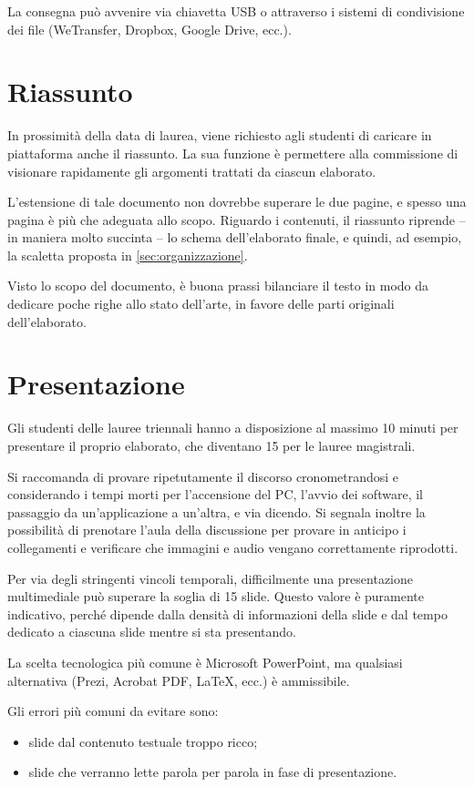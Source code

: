 \documentclass[12pt]{report}
\begin{document}
    La consegna può avvenire via chiavetta USB o attraverso i sistemi di condivisione dei file (WeTransfer, Dropbox, Google Drive, ecc.).


    \section{Riassunto}
    In prossimità della data di laurea, viene richiesto agli studenti di caricare in piattaforma anche il riassunto. La sua funzione è permettere alla commissione di visionare rapidamente gli argomenti trattati da ciascun elaborato.

    L'estensione di tale documento non dovrebbe superare le due pagine, e spesso una pagina è più che adeguata allo scopo. Riguardo i contenuti, il riassunto riprende -- in maniera molto succinta -- lo schema dell'elaborato finale, e quindi, ad esempio, la scaletta proposta in \ref{sec:organizzazione}.

    Visto lo scopo del documento, è buona prassi bilanciare il testo in modo da dedicare poche righe allo stato dell'arte, in favore delle parti originali dell'elaborato.


    \section{Presentazione}
    Gli studenti delle lauree triennali hanno a disposizione al massimo 10 minuti per presentare il proprio elaborato, che diventano 15 per le lauree magistrali.

    Si raccomanda di provare ripetutamente il discorso cronometrandosi e considerando i tempi morti per l'accensione del PC, l'avvio dei software, il passaggio da un'applicazione a un'altra, e via dicendo. Si segnala inoltre la possibilità di prenotare l'aula della discussione per provare in anticipo i collegamenti e verificare che immagini e audio vengano correttamente riprodotti.

    Per via degli stringenti vincoli temporali, difficilmente una presentazione multimediale può superare la soglia di 15 slide. Questo valore è puramente indicativo, perché dipende dalla densità di informazioni della slide e dal tempo dedicato a ciascuna slide mentre si sta presentando.

    La scelta tecnologica più comune è Microsoft PowerPoint, ma qualsiasi alternativa (Prezi, Acrobat PDF, \LaTeX, ecc.) è ammissibile.

    Gli errori più comuni da evitare sono:
    \begin{itemize}
        \item slide dal contenuto testuale troppo ricco;
        \item slide che verranno lette parola per parola in fase di presentazione.
    \end{itemize}
\end{document}
